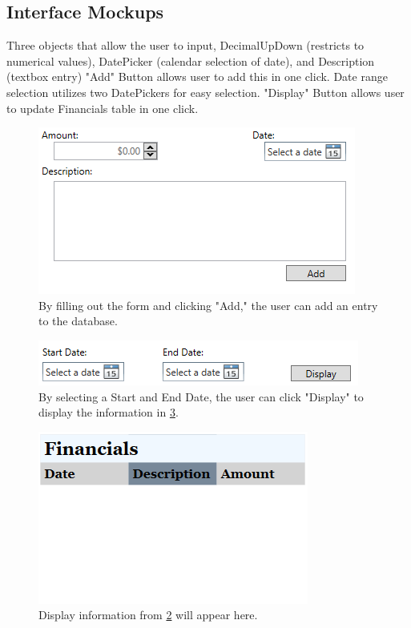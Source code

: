 \documentclass[10pt,conference,onecolumn,compsoc]{IEEEtran}
\begin{document}

\subsection{Interface Mockups}
Three objects that allow the user to input, DecimalUpDown (restricts to numerical values), DatePicker (calendar selection of date), and Description (textbox entry)
 "Add" Button allows user to add this in one click.
Date range selection utilizes two DatePickers for easy selection.
"Display" Button allows user to update Financials table in one click.

\begin{figure}[ht!]
\includegraphics[scale=1]{AddEntry.png}
\caption{By filling out the form and clicking "Add," the user can add an entry to the database.}
\label{AddEntry}
\end{figure}

\begin{figure}[ht!]
\includegraphics[scale=1]{DateRange.png}
\caption{By selecting a Start and End Date, the user can click "Display" to display the information in \ref{FinancialsTable}.}
\label{DateRange}
\end{figure}

\begin{figure}[ht!]
\includegraphics[scale=1]{FinancialsTable.png}
\caption{Display information from \ref{DateRange} will appear here.}
\label{FinancialsTable}
\end{figure}
\end{document}
